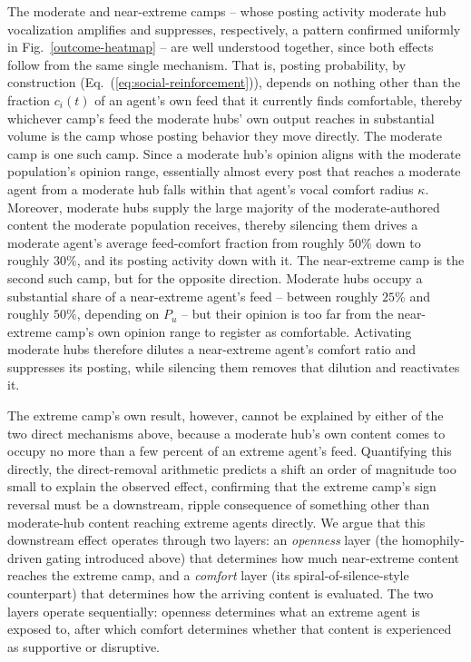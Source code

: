 \documentclass{svproc}
\def\VCR{\kappa}                 %
\begin{document}
The moderate and near-extreme camps -- whose posting activity
moderate hub vocalization amplifies and suppresses, respectively, a
pattern confirmed uniformly in Fig.~\ref{outcome-heatmap} -- are
well understood together, since both effects follow from the same
single mechanism. That is, posting probability, by construction
(Eq.~(\ref{eq:social-reinforcement})), depends on nothing other
than the fraction $c_i(t)$ of an agent's own feed that it currently
finds comfortable, thereby whichever camp's feed the moderate hubs' own
output reaches in substantial volume is the camp whose posting
behavior they move directly. The moderate camp is one such camp. 
Since a
moderate hub's opinion aligns with the moderate population's
opinion range, essentially almost every post that reaches a moderate
agent from a moderate hub falls within that agent's vocal comfort
radius $\VCR$. 
Moreover, moderate hubs supply the large majority of
the moderate-authored content the moderate population receives, thereby
silencing them drives a moderate agent's average feed-comfort
fraction from roughly $50\%$ down to roughly $30\%$, and its
posting activity down with it. The near-extreme camp is the second
such camp, but for the opposite direction. Moderate hubs occupy a
substantial share of a near-extreme agent's feed -- between roughly
$25\%$ and roughly $50\%$, depending on $P_u$ -- but their
opinion is too far from the
near-extreme camp's own opinion range to register as comfortable.
Activating moderate hubs therefore dilutes a near-extreme agent's
comfort ratio and suppresses its posting, while silencing them
removes that dilution and reactivates it.

The extreme camp's own result, however, cannot be explained by
either of the two direct mechanisms above, because 
a moderate hub's own
content comes to occupy no more than a few percent of an extreme
agent's feed. 
Quantifying this directly, the direct-removal arithmetic 
predicts a shift an order of magnitude too small
to explain the observed effect, 
confirming that the extreme camp's sign reversal must be a
downstream, ripple consequence of something other than
moderate-hub content reaching extreme agents directly.
We argue that this downstream effect operates through
two layers: an \emph{openness} layer (the homophily-driven gating
introduced above) that determines how much near-extreme content
reaches the extreme camp, and a \emph{comfort} layer (its
spiral-of-silence-style counterpart) that determines how the arriving
content is evaluated. The two layers operate sequentially: openness
determines what an extreme agent is exposed to, after which comfort
determines whether that content is experienced as supportive or
disruptive.
\end{document}
